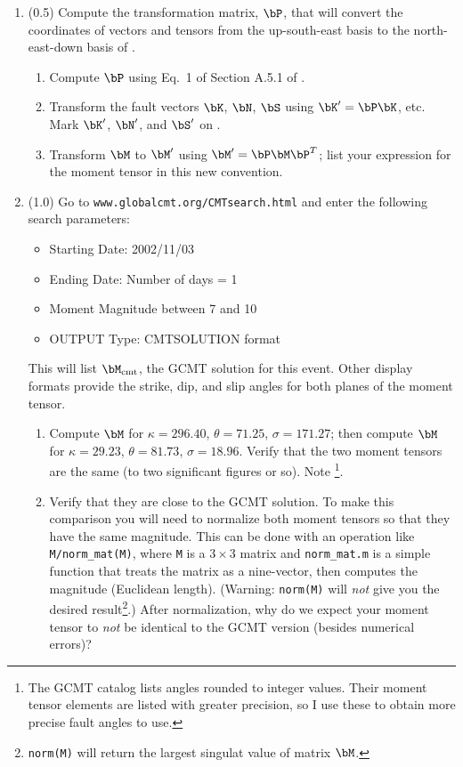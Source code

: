 \documentclass[11pt,titlepage,fleqn]{article}
\begin{document}
\begin{enumerate}
\item (0.5) Compute the transformation matrix, $\bP$, that will convert the coordinates of vectors and tensors from the up-south-east basis to the north-east-down basis of \citet{AkiRichardsE2}.
%
\begin{enumerate}
\item Compute $\bP$ using Eq.~1 of Section A.5.1 of \cite{SteinWysession}.

\item Transform the fault vectors $\bK$, $\bN$, $\bS$ using $\bK' = \bP\bK$, etc. Mark $\bK'$, $\bN'$, and $\bS'$ on .

\item Transform $\bM$ to $\bM'$ using $\bM' = \bP \bM \bP^T$; list your expression for the moment tensor in this new convention.
\end{enumerate}


\item (1.0) Go to \verb+www.globalcmt.org/CMTsearch.html+ and enter the following search parameters:

\begin{itemize}
\item Starting Date: 2002/11/03
\item Ending Date: Number of days = 1
\item Moment Magnitude between 7 and 10
\item OUTPUT Type: CMTSOLUTION format
\end{itemize}
%
This will list $\bM_{\rm cmt}$, the GCMT solution for this event. Other display formats provide the strike, dip, and slip angles for both planes of the moment tensor.

\begin{enumerate}
\item Compute $\bM$ for $\kappa = 296.40$, $\theta = 71.25$, $\sigma = 171.27$; then compute $\bM$ for $\kappa = 29.23$, $\theta = 81.73$, $\sigma = 18.96$. Verify that the two moment tensors are the same (to two significant figures or so). Note \footnote{The GCMT catalog lists angles rounded to integer values. Their moment tensor elements are listed with greater precision, so I use these to obtain more precise fault angles to use.}.

\item Verify that they are close to the GCMT solution. To make this comparison you will need to normalize both moment tensors so that they have the same magnitude. This can be done with an operation like \verb+M/norm_mat(M)+, where \verb+M+ is a $3 \times 3$ matrix and \verb+norm_mat.m+ is a simple function that treats the matrix as a nine-vector, then computes the magnitude (\ie Euclidean length). (Warning: \verb+norm(M)+ will {\em not} give you the desired result\footnote{{\tt norm(M)} will return the largest singulat value of matrix $\bM$.}.)
After normalization, why do we expect your moment tensor to {\em not} be identical to the GCMT version (besides numerical errors)?


\end{enumerate}
\end{enumerate}
\end{document}
